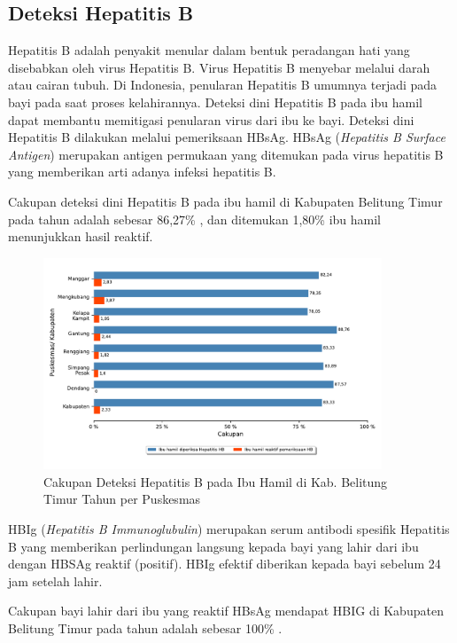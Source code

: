 \subsection{Deteksi Hepatitis B}
Hepatitis B adalah penyakit menular dalam bentuk peradangan hati yang disebabkan oleh virus Hepatitis B. Virus Hepatitis B menyebar melalui darah atau cairan tubuh. Di Indonesia, penularan Hepatitis B umumnya terjadi pada bayi pada saat proses kelahirannya. Deteksi dini Hepatitis B pada ibu hamil dapat membantu memitigasi penularan virus dari ibu ke bayi. Deteksi dini Hepatitis B dilakukan melalui pemeriksaan HBsAg. HBsAg (\emph{Hepatitis B Surface Antigen}) merupakan antigen permukaan yang ditemukan pada virus hepatitis B yang memberikan arti adanya infeksi hepatitis B.

Cakupan deteksi dini Hepatitis B pada ibu hamil di Kabupaten Belitung Timur pada tahun \tP adalah sebesar 86,27\% , dan ditemukan 1,80\% ibu hamil menunjukkan hasil reaktif.

\begin{figure}[H]
	\centering{}
	\includegraphics[width=0.9\textwidth]{bab_06/bab_06_05a_bumilHB}
	\caption{Cakupan Deteksi Hepatitis B pada Ibu Hamil di Kab. Belitung Timur Tahun \tP per Puskesmas}
	\label{fig:Cakupan-Bumil-HB}
\end{figure}

HBIg (\emph{Hepatitis B Immunoglubulin}) merupakan serum antibodi spesifik Hepatitis B yang memberikan perlindungan langsung kepada bayi yang lahir dari ibu dengan HBSAg reaktif (positif). HBIg efektif diberikan kepada bayi sebelum 24 jam setelah lahir.

Cakupan bayi lahir dari ibu yang reaktif HBsAg mendapat HBIG di Kabupaten Belitung Timur pada tahun \tP adalah sebesar 100\% .

